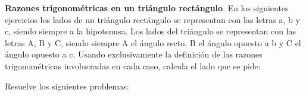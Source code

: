 \documentclass[spanish, 11pt]{exam}
\begin{document}
\begin{questions}
\begin{multicols}{2}
\begin{parts}
\end{parts}
\end{multicols}






\question \textbf{Razones trigonométricas en un triángulo rectángulo}. En los siguientes ejercicios los lados de un triángulo
rectángulo se representan con las letras a, b y c, siendo siempre a la hipotenusa. Los lados del triángulo se
representan con las letras A, B y C, siendo siempre A el ángulo recto, B el ángulo opuesto a b y C el ángulo
opuesto a c. Usando exclusivamente la definición de las razones trigonométricas involucradas en cada caso,
calcula el lado que se pide:
\begin{multicols}{2}
\end{multicols}

\question Resuelve los siguientes problemas:
\begin{multicols}{2}
\end{multicols}
\end{questions}
\end{document}
